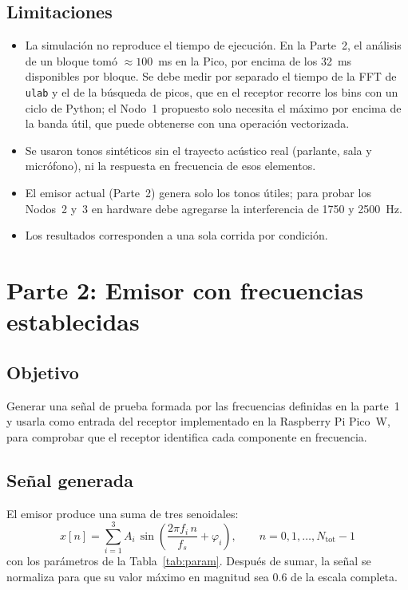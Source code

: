 \documentclass[11pt,a4paper]{article}
\begin{document}
\subsection{Limitaciones}
\begin{itemize}
  \item La simulación no reproduce el tiempo de ejecución. En la Parte~2, el
        análisis de un bloque tomó $\approx 100$~ms en la Pico, por encima de
        los 32~ms disponibles por bloque. Se debe medir por separado el
        tiempo de la FFT de \texttt{ulab} y el de la búsqueda de picos, que en
        el receptor recorre los bins con un ciclo de Python; el Nodo~1 propuesto
        solo necesita el máximo por encima de la banda útil, que puede
        obtenerse con una operación vectorizada.
  \item Se usaron tonos sintéticos sin el trayecto acústico real
        (parlante, sala y micrófono), ni la respuesta en frecuencia de esos
        elementos.
  \item El emisor actual (Parte~2) genera solo los tonos útiles; para probar
        los Nodos~2 y~3 en hardware debe agregarse la interferencia de 1750
        y 2500~Hz.
  \item Los resultados corresponden a una sola corrida por condición.
\end{itemize}
 

\section{Parte 2: Emisor con frecuencias establecidas}

\subsection{Objetivo}
Generar una señal de prueba formada por las frecuencias definidas en la
parte~1 y usarla como entrada del receptor implementado en la
Raspberry Pi Pico~W, para comprobar que el receptor identifica cada
componente en frecuencia.

\subsection{Señal generada}
El emisor produce una suma de tres senoidales:
\begin{equation}
  x[n] = \sum_{i=1}^{3} A_i \,\sin\!\left(\frac{2\pi f_i\, n}{f_s} + \varphi_i\right),
  \qquad n = 0,1,\dots,N_{\text{tot}}-1
\end{equation}
con los parámetros de la Tabla~\ref{tab:param}. Después de sumar, la señal
se normaliza para que su valor máximo en magnitud sea $0.6$ de la escala
completa.
\end{document}
